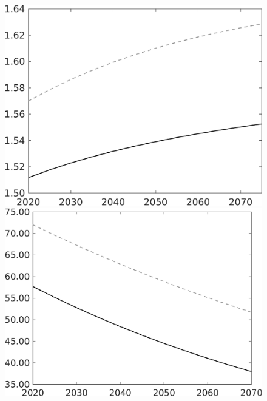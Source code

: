 \documentclass[12pt]{article}
\begin{document}
\begin{figure}
\begin{minipage}[]{0.32\textwidth}
	\end{minipage}		
	\begin{minipage}[]{0.32\textwidth}
		\includegraphics[width=1\textwidth]{../../codding_model/own_basedOnFried/optimalPol_010922_revision/figures/all_13Sept22/LevTaufNoTauf_TaulCalib_regime0_pn_spillover0_nsk0_xgr0_knspil1_sep1_LFlimit0_emsbase0_countec0_GovRev0_etaa0.79_lgd0.png}
	\end{minipage}
	\begin{minipage}[]{0.32\textwidth}
		\includegraphics[width=1\textwidth]{../../codding_model/own_basedOnFried/optimalPol_010922_revision/figures/all_13Sept22/LevTaufNoTauf_TaulCalib_regime0_gAf_spillover0_nsk0_xgr0_knspil1_sep1_LFlimit0_emsbase0_countec0_GovRev0_etaa0.79_lgd0.png}

\end{minipage}
\end{figure}
\end{document}
